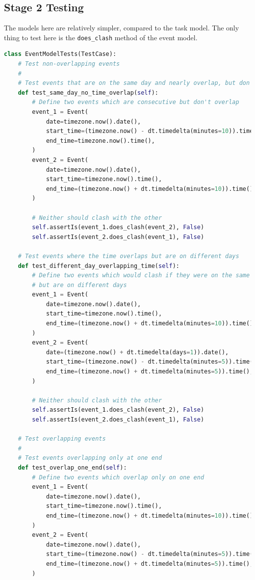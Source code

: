 \documentclass{article}
\begin{document}
\subsection{Stage 2 Testing}
The models here are relatively simpler,
compared to the task model.
The only thing to test here is the \texttt{does\_clash} method of the event model.

\begin{lstlisting}[language=Python]
class EventModelTests(TestCase):
    # Test non-overlapping events
    #
    # Test events that are on the same day and nearly overlap, but don't
    def test_same_day_no_time_overlap(self):
        # Define two events which are consecutive but don't overlap
        event_1 = Event(
            date=timezone.now().date(),
            start_time=(timezone.now() - dt.timedelta(minutes=10)).time(),
            end_time=timezone.now().time(),
        )
        event_2 = Event(
            date=timezone.now().date(),
            start_time=timezone.now().time(),
            end_time=(timezone.now() + dt.timedelta(minutes=10)).time(),
        )

        # Neither should clash with the other
        self.assertIs(event_1.does_clash(event_2), False)
        self.assertIs(event_2.does_clash(event_1), False)

    # Test events where the time overlaps but are on different days
    def test_different_day_overlapping_time(self):
        # Define two events which would clash if they were on the same day,
        # but are on different days
        event_1 = Event(
            date=timezone.now().date(),
            start_time=timezone.now().time(),
            end_time=(timezone.now() + dt.timedelta(minutes=10)).time(),
        )
        event_2 = Event(
            date=(timezone.now() + dt.timedelta(days=1)).date(),
            start_time=(timezone.now() - dt.timedelta(minutes=5)).time(),
            end_time=(timezone.now() + dt.timedelta(minutes=5)).time(),
        )

        # Neither should clash with the other
        self.assertIs(event_1.does_clash(event_2), False)
        self.assertIs(event_2.does_clash(event_1), False)

    # Test overlapping events
    #
    # Test events overlapping only at one end
    def test_overlap_one_end(self):
        # Define two events which overlap only on one end
        event_1 = Event(
            date=timezone.now().date(),
            start_time=timezone.now().time(),
            end_time=(timezone.now() + dt.timedelta(minutes=10)).time(),
        )
        event_2 = Event(
            date=timezone.now().date(),
            start_time=(timezone.now() - dt.timedelta(minutes=5)).time(),
            end_time=(timezone.now() + dt.timedelta(minutes=5)).time(),
        )


\end{lstlisting}
\end{document}
